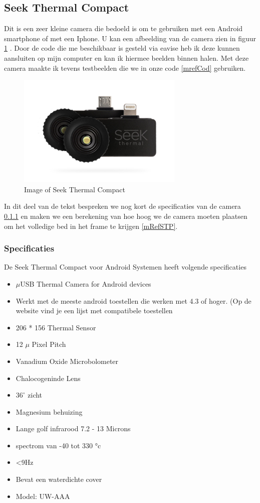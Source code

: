 \subsection{Seek Thermal Compact}
\label{mRefSTh}
 Dit is een zeer kleine camera die bedoeld is om te gebruiken met een Android smartphone of met een Iphone. U kan een afbeelding van de camera zien in figuur \ref{imgSTC} \cite{bibImgSTC}. Door de code die me beschikbaar is gesteld via eavise \cite{bibSTC} heb ik deze kunnen aansluiten op mijn computer en kan ik hiermee beelden binnen halen. Met deze camera maakte ik tevens testbeelden die we in onze code \ref{mrefCod} gebruiken.
\begin{figure}[h]
	\includegraphics[scale=0.75]{SeekThermalCompac}
	\caption{Image of Seek Thermal Compact}
	\label{imgSTC}
\end{figure}
In dit deel van de tekst bespreken we nog kort de specificaties van de camera \ref{mRefSTS} en maken we een berekening van hoe hoog we de camera moeten plaatsen om het volledige bed in het frame te krijgen \ref{mRefSTP}.

\subsubsection{Specificaties}
\label{mRefSTS}
De Seek Thermal Compact voor Android Systemen heeft volgende specificaties
\begin{itemize}
	\item $\mu$USB Thermal Camera for Android devices
	\item Werkt met de meeste android toestellen die werken met 4.3 of hoger. (Op de website vind je een lijst met compatibele toestellen \cite{bibImgSTC}
	\item 206 * 156 Thermal Sensor
	\item 12 $\mu$ Pixel Pitch
	\item Vanadium Oxide Microbolometer
	\item Chalocogeninde Lens
	\item $36^{\circ}$ zicht
	\item Magnesium behuizing
	\item Lange golf infrarood 7.2 - 13 Microns
	\item  spectrom van -40 tot 330 °c
	\item <9Hz
	\item Bevat een waterdichte cover
	\item Model: UW-AAA
\end{itemize}
\cite{bibImgSTC}

